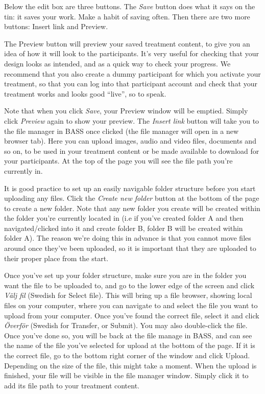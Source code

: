\documentclass[]{book}
\begin{document}
Below the edit box are three buttons. The \emph{Save} button does what it says on the tin: it saves your work. Make a habit of saving often.
Then there are two more buttons: Insert link and Preview.

The Preview button will preview your saved treatment content, to give you an idea of how it will look to the participants. It's very useful for checking that your design looks as intended, and as a quick way to check your progress. We recommend that you also create a dummy participant for which you activate your treatment, so that you can log into that participant account and check that your treatment works and looks good ``live'', so to speak.

Note that when you click \emph{Save}, your Preview window will be emptied. Simply click \emph{Preview} again to show your preview.
The \emph{Insert link} button will take you to the file manager in BASS once clicked (the file manager will open in a new browser tab). Here you can upload images, audio and video files, documents and so on, to be used in your treatment content or be made available to download for your participants. At the top of the page you will see the file path you're currently in.

It is good practice to set up an easily navigable folder structure before you start uploading any files. Click the \emph{Create new folder} button at the bottom of the page to create a new folder. Note that any new folder you create will be created within the folder you're currently located in (i.e if you've created folder A and then navigated/clicked into it and create folder B, folder B will be created within folder A). The reason we're doing this in advance is that you cannot move files around once they've been uploaded, so it is important that they are uploaded to their proper place from the start.

Once you've set up your folder structure, make sure you are in the folder you want the file to be uploaded to, and go to the lower edge of the screen and click \emph{Välj fil} (Swedish for Select file). This will bring up a file browser, showing local files on your computer, where you can navigate to and select the file you want to upload from your computer. Once you've found the correct file, select it and click \emph{Överför} (Swedish for Transfer, or Submit). You may also double-click the file. Once you've done so, you will be back at the file manage in BASS, and can see the name of the file you've selected for upload at the bottom of the page. If it is the correct file, go to the bottom right corner of the window and click Upload. Depending on the size of the file, this might take a moment. When the upload is finished, your file will be visible in the file manager window. Simply click it to add its file path to your treatment content.
\end{document}

